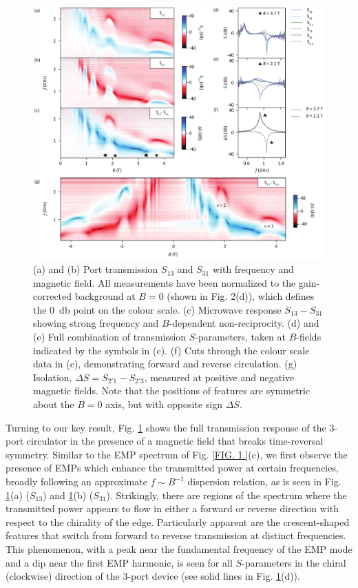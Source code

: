 \begin{figure}
\includegraphics[width=\textwidth]{fig3_QH}
\caption[Non-reciprocal response of the quantum Hall circulator]{\label{FIG. 3.}
(a) and (b) Port transmission $S_{13}$ and $S_{31}$ with frequency and magnetic field. All measurements have been normalized to the gain-corrected background at $B = 0$ (shown in Fig. 2(d)), which defines the \SI{0}{\decibel} point on the colour scale.
(c) Microwave response $S_{13}-S_{31}$ showing strong frequency and $B$-dependent non-reciprocity.
(d) and (e) Full combination of transmission $S$-parameters, taken at $B$-fields indicated by the symbols in (c).
(f) Cuts through the colour scale data in (c), demonstrating forward and reverse circulation.
(g) Isolation, $\Delta S = S_{2'1}-S_{2'3}$, measured at positive and negative magnetic fields. Note that the positions of features are symmetric about the $B = 0$ axis, but with opposite sign $\Delta S$.}
\end{figure}

Turning to our key result, Fig. \ref{FIG. 3.} shows the full transmission response of the 3-port circulator in the presence of a magnetic field that breaks time-reversal symmetry. Similar to the EMP spectrum of Fig. \ref{FIG. 1.}(c), we first observe the presence of EMPs which enhance the transmitted power at certain frequencies, broadly following an approximate $f \sim B^{-1}$ dispersion relation, as is seen in Fig. \ref{FIG. 3.}(a) ($S_{13}$) and \ref{FIG. 3.}(b) ($S_{31}$). Strikingly, there are regions of the spectrum where the transmitted power appears to flow in either a forward or reverse direction with respect to the chirality of the edge. Particularly apparent are the crescent-shaped features that switch from forward to reverse transmission at distinct frequencies. This phenomenon, with a peak near the fundamental frequency of the EMP mode and a dip near the first EMP harmonic, is seen for all $S$-parameters in the chiral (clockwise) direction of the 3-port device (see solid lines in Fig. \ref{FIG. 3.}(d)).

